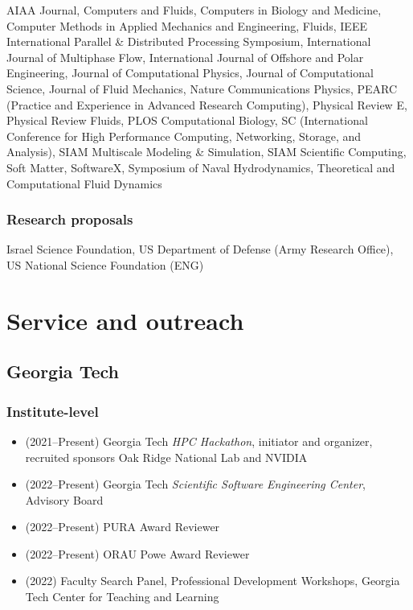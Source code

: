 AIAA Journal,
Computers and Fluids,
Computers in Biology and Medicine,
Computer Methods in Applied Mechanics and Engineering,
Fluids,
IEEE International Parallel \& Distributed Processing Symposium,
International Journal of Multiphase Flow,
International Journal of Offshore and Polar Engineering,
Journal of Computational Physics,
Journal of Computational Science,
Journal of Fluid Mechanics,
Nature Communications Physics,
PEARC (Practice and Experience in Advanced Research Computing),
Physical Review E,
Physical Review Fluids,
PLOS Computational Biology,
SC (International Conference for High Performance Computing, Networking, Storage, and Analysis),
SIAM Multiscale Modeling \& Simulation,
SIAM Scientific Computing,
Soft Matter,
SoftwareX,
Symposium of Naval Hydrodynamics,
Theoretical and Computational Fluid Dynamics

\subsubsection{Research proposals}

Israel Science Foundation, US Department of Defense (Army Research Office), US National Science Foundation (ENG)

\section{Service and outreach}

\subsection{Georgia Tech}

\subsubsection{Institute-level}

\begin{itemize}
    \item (2021--Present) Georgia Tech \textit{HPC Hackathon}, initiator and organizer, recruited sponsors Oak Ridge National Lab and NVIDIA 
    \item (2022--Present) Georgia Tech \textit{Scientific Software Engineering Center}, Advisory Board
    \item (2022--Present) PURA Award Reviewer
    \item (2022--Present) ORAU Powe Award Reviewer
    \item (2022) Faculty Search Panel, Professional Development Workshops, Georgia Tech Center for Teaching and Learning
\end{itemize}

